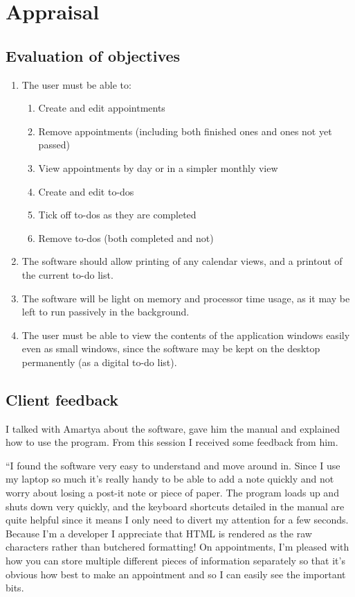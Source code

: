 \section{Appraisal}
\subsection{Evaluation of objectives}

\begin{enumerate}
    \item The user must be able to:
    \begin{enumerate}
        \item Create and edit appointments
        \item Remove appointments (including both finished ones and ones not yet
            passed)
        \item View appointments by day or in a simpler monthly view
        \item Create and edit to-dos
        \item Tick off to-dos as they are completed
        \item Remove to-dos (both completed and not)
    \end{enumerate}
    \item The software should allow printing of any calendar views, and a
        printout of the current to-do list.
    \item The software will be light on memory and processor time usage, as it
        may be left to run passively in the background.
    \item The user must be able to view the contents of the application
        windows easily even as small windows, since the software may be kept
        on the desktop permanently (as a digital to-do list).
\end{enumerate}


\subsection{Client feedback}

I talked with Amartya about the software, gave him the manual and explained how
to use the program. From this session I received some feedback from him.

``I found the software very easy to understand and move around in. Since I use
my laptop so much it's really handy to be able to add a note quickly and not
worry about losing a post-it note or piece of paper. The program loads up and
shuts down very quickly, and the keyboard shortcuts detailed in the manual are
quite helpful since it means I only need to divert my attention for a few
seconds. Because I'm a developer I appreciate that HTML is rendered as the raw
characters rather than butchered formatting! On appointments, I'm pleased with
how you can store multiple different pieces of information separately so that
it's obvious how best to make an appointment and so I can easily see the
important bits.

